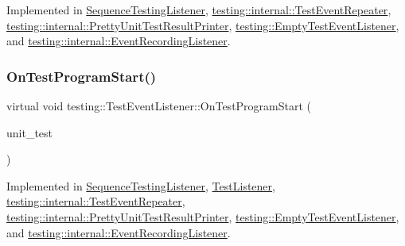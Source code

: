 Implemented in \hyperlink{class_sequence_testing_listener_aacac5e15bac089460841ff63a5c31f57}{Sequence\+Testing\+Listener}, \hyperlink{classtesting_1_1internal_1_1_test_event_repeater_a4622616259747dbcc23f5ee39ef99ec0}{testing\+::internal\+::\+Test\+Event\+Repeater}, \hyperlink{classtesting_1_1internal_1_1_pretty_unit_test_result_printer_a8c92c062889abdb940b04ffe113f5980}{testing\+::internal\+::\+Pretty\+Unit\+Test\+Result\+Printer}, \hyperlink{classtesting_1_1_empty_test_event_listener_a0abcc02bd2331a2e29ad6f4d9daf2a32}{testing\+::\+Empty\+Test\+Event\+Listener}, and \hyperlink{classtesting_1_1internal_1_1_event_recording_listener_a21fe9c3c519c4599a48b16ddfb734aa3}{testing\+::internal\+::\+Event\+Recording\+Listener}.

\mbox{\label{classtesting_1_1_test_event_listener_a5f6c84f39851e8a603a2d2e10063816b}} 
\subsubsection{\texorpdfstring{On\+Test\+Program\+Start()}{OnTestProgramStart()}}
{\footnotesize\ttfamily virtual void testing\+::\+Test\+Event\+Listener\+::\+On\+Test\+Program\+Start (\begin{DoxyParamCaption}\item[{const \hyperlink{classtesting_1_1_unit_test}{Unit\+Test} \&}]{unit\+\_\+test }\end{DoxyParamCaption})\hspace{0.3cm}{\ttfamily [pure virtual]}}



Implemented in \hyperlink{class_sequence_testing_listener_a25b96acdbaa6f582e583e6b56bd39b42}{Sequence\+Testing\+Listener}, \hyperlink{class_test_listener_a6218f522f5b6b37050ff0ea630ac5fd3}{Test\+Listener}, \hyperlink{classtesting_1_1internal_1_1_test_event_repeater_a15ee2ff051063088d3a89a266d5ffcc4}{testing\+::internal\+::\+Test\+Event\+Repeater}, \hyperlink{classtesting_1_1internal_1_1_pretty_unit_test_result_printer_a7a6b6de195b4ef3c9f2edd2e6c270f3e}{testing\+::internal\+::\+Pretty\+Unit\+Test\+Result\+Printer}, \hyperlink{classtesting_1_1_empty_test_event_listener_aa3847c8a3c22d8d69a6006dfdd6589fc}{testing\+::\+Empty\+Test\+Event\+Listener}, and \hyperlink{classtesting_1_1internal_1_1_event_recording_listener_aff89fdd3ae889a54a2ba2f3d4c98d3f6}{testing\+::internal\+::\+Event\+Recording\+Listener}.


